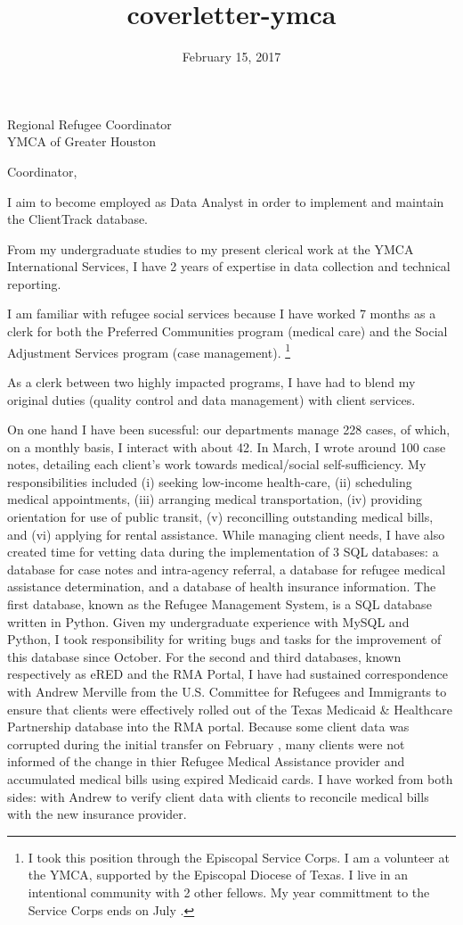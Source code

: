 \documentclass[10pt]{letter}
\date{February 15, 2017}
\title{coverletter-ymca}
\begin{document}
\begin{letter}{
Regional Refugee Coordinator\\
YMCA of Greater Houston
}
\opening{Coordinator,}

I aim to become employed as Data Analyst in order to implement and maintain the ClientTrack database. 

From my undergraduate studies to my present clerical work at the YMCA International Services, I have 2 years of expertise in data collection and technical reporting. 

I am familiar with refugee social services because I have worked 7 months as a clerk for both the  Preferred Communities program (medical care) and the Social Adjustment Services program (case management). \footnote{I took this position through the Episcopal Service Corps. I am a volunteer at the YMCA, supported by the Episcopal Diocese of Texas. I live in an intentional community with 2 other fellows. My year committment to the Service Corps ends on July .} 

As a clerk between two highly impacted programs, I have had to blend my original duties (quality control and data management) with client services. 

	On one hand I have been sucessful: our departments manage 228 cases, of which, on a monthly basis, I interact with about 42. In March, I wrote around 100 case notes, detailing each client's work towards medical/social self-sufficiency. My responsibilities included (i) seeking low-income health-care, (ii) scheduling medical appointments, (iii) arranging medical transportation, (iv) providing orientation for use of public transit, (v) reconcilling outstanding medical bills, and (vi) applying for rental assistance. While managing client needs, I have also created time for vetting data during the implementation of 3 SQL databases: a database for case notes and intra-agency referral, a database for refugee medical assistance determination, and a database of health insurance information. The first database, known as the Refugee Management System, is a SQL database written in Python. %
	Given my undergraduate experience with MySQL and Python, I took responsibility for writing bugs and tasks for the improvement of this database since October. For the second and third databases, known respectively as eRED and the RMA Portal, I have had sustained correspondence with Andrew Merville from the U.S. Committee for Refugees and Immigrants to ensure that clients were effectively rolled out of the Texas Medicaid \& Healthcare Partnership database into the RMA portal. Because some client data was corrupted during the initial transfer on February , many clients were not informed of the change in thier Refugee Medical Assistance provider and accumulated medical bills using expired Medicaid cards. I have worked from both sides: with Andrew to verify client data with clients to reconcile medical bills with the new insurance provider. 


\end{letter}
\end{document}

